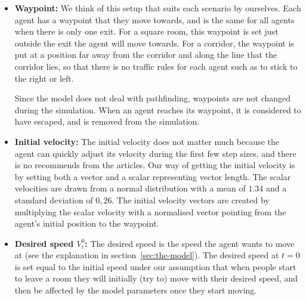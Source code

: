 \begin{itemize}
    \item \textbf{Waypoint:} We think of this setup that suits each scenario  
        by ourselves. Each agent has a waypoint that they move towards, 
        and is the same for all agents when there is only one exit. 
        For a square room, this waypoint is set just outside the exit the agent 
        will move towards. For a corridor, the waypoint is put at a position 
        far away from the corridor and along the line that the corridor lies, so that
        there is no traffic rules for each agent such as to stick to the right or left.
        
        Since the model does not deal with pathfinding, waypoints are not 
        changed during the simulation. When an agent reaches its waypoint, it is 
        considered to have escaped, and is removed from the simulation.

    \item \textbf{Initial velocity:} The initial velocity does not matter much 
        because the agent can quickly adjust its velocity during the first few 
        step sizes, and there is no recommends from the articles. 
        Our way of getting the initial velocity is by setting both a vector and a scalar 
        representing vector length. The scalar velocities are drawn from a 
        normal distribution with a mean of $1.34$ and a standard deviation of 
        $0,26$. The initial velocity vectors are created by multiplying the 
        scalar velocity with a normalised vector pointing from the agent's 
        initial position to the waypoint.

    \item \textbf{Desired speed $  V_{i}^{0}  $:} The desired speed is 
        the speed the agent wants to move at (see the explanation in 
        section~\ref{sec:the-model}). The desired speed at $ t=0 $ is set 
        equal to the initial speed 
        under our assumption that when people start to leave a room they will 
        initially (try to) move with their desired speed, and then be 
        affected by the model parameters once they start moving.


\end{itemize}
